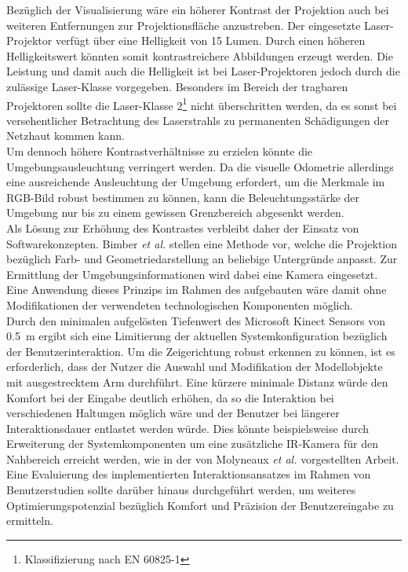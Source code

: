 Bezüglich der Visualisierung wäre ein höherer Kontrast der Projektion auch bei weiteren Entfernungen zur Projektionsfläche anzustreben. Der eingesetzte Laser-Projektor verfügt über eine Helligkeit von 15 Lumen. Durch einen höheren Helligkeitswert könnten somit kontrastreichere Abbildungen erzeugt werden. Die Leistung und damit auch die Helligkeit ist bei Laser-Projektoren jedoch durch die zulässige Laser-Klasse vorgegeben. Besonders im Bereich der tragbaren Projektoren sollte die Laser-Klasse 2\footnote{Klassifizierung nach EN 60825-1} nicht überschritten werden, da es sonst bei versehentlicher Betrachtung des Laserstrahls zu permanenten Schädigungen der Netzhaut kommen kann.\\
Um dennoch höhere Kontrastverhältnisse zu erzielen könnte die Umgebungsausleuchtung verringert werden. Da die visuelle Odometrie allerdings eine ausreichende Ausleuchtung der Umgebung erfordert, um die Merkmale im RGB-Bild robust bestimmen zu können, kann die Beleuchtungsstärke der Umgebung nur bis zu einem gewissen Grenzbereich abgesenkt werden.\\
Als Lösung zur Erhöhung des Kontrastes verbleibt daher der Einsatz von Softwarekonzepten. Bimber \textit{et al.} stellen eine Methode vor, welche die Projektion bezüglich Farb- und Geometriedarstellung an beliebige Untergründe anpasst. Zur Ermittlung der Umgebungsinformationen wird dabei eine Kamera eingesetzt. Eine Anwendung dieses Prinzips im Rahmen des aufgebauten  wäre damit ohne Modifikationen der verwendeten technologischen Komponenten möglich.\\

Durch den minimalen aufgelösten Tiefenwert des Microsoft Kinect Sensors von \SI{0,5}{\meter} ergibt sich eine Limitierung der aktuellen Systemkonfiguration bezüglich der Benutzerinteraktion. Um die Zeigerichtung robust erkennen zu können, ist es erforderlich, dass der Nutzer die Auswahl und Modifikation der Modellobjekte mit ausgestrecktem Arm durchführt. Eine kürzere minimale Distanz würde den Komfort bei der Eingabe deutlich erhöhen, da so die Interaktion bei verschiedenen Haltungen möglich wäre und der Benutzer bei längerer Interaktionsdauer entlastet werden würde. Dies könnte beispielsweise durch Erweiterung der Systemkomponenten um eine zusätzliche IR-Kamera für den Nahbereich erreicht werden, wie in der von Molyneaux \textit{et al.} \cite{Molyneaux2012} vorgestellten Arbeit.\\
Eine Evaluierung des implementierten Interaktionsansatzes im Rahmen von Benutzerstudien sollte darüber hinaus durchgeführt werden, um weiteres Optimierungspotenzial bezüglich Komfort und Präzision der Benutzereingabe zu ermitteln.\\

